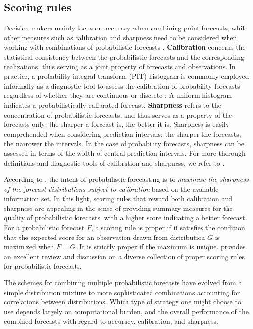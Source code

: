 \documentclass[a4paper,11pt]{article}
\begin{document}
\subsection{Scoring rules}
\label{sec:issues}

Decision makers mainly focus on accuracy when combining point forecasts, while other measures such as calibration and sharpness need to be considered when working with combinations of probabilistic forecasts \citep{Gneiting2007-fr,Gneiting2007-ij,Lahiri2015-qq}. \textbf{Calibration} concerns the statistical consistency between the probabilistic forecasts and the corresponding realizations, thus serving as a joint property of forecasts and observations. In practice, a probability integral transform (PIT) histogram is commonly employed informally as a diagnostic tool to assess the calibration of probability forecasts regardless of whether they are continuous \citep{Dawid1984-vp,Diebold1998-cr} or discrete \citep{Gneiting2013-hl}: A uniform histogram indicates a probabilistically calibrated forecast. \textbf{Sharpness} refers to the concentration of probabilistic forecasts, and thus serves as a property of the forecasts only; the sharper a forecast is, the better it is. Sharpness is easily comprehended when considering prediction intervals: the sharper the forecasts, the narrower the intervals. In the case of probability forecasts, sharpness can be assessed in terms of the width of central prediction intervals. For more thorough definitions and diagnostic tools of calibration and sharpness, we refer to \citet{Gneiting2014-tz}.

According to \citet{Gneiting2007-fr}, the intent of probabilistic forecasting is to \textit{maximize the sharpness of the forecast distributions subject to calibration} based on the available information set. In this light, scoring rules that reward both calibration and sharpness are appealing in the sense of providing summary measures for the quality of probabilistic forecasts, with a higher score indicating a better forecast. For a probabilistic forecast $F$, a scoring rule is proper if it satisfies the condition that the expected score for an observation drawn from distribution $G$ is maximized when $F=G$. It is strictly proper if the maximum is unique. \citet{Gneiting2007-ij} provides an excellent review and discussion on a diverse collection of proper scoring rules for probabilistic forecasts.

The schemes for combining multiple probabilistic forecasts have evolved from a simple distribution mixture to more sophisticated combinations accounting for correlations between distributions. Which type of strategy one might choose to use depends largely on computational burden, and the overall performance of the combined forecasts with regard to accuracy, calibration, and sharpness.
\end{document}

